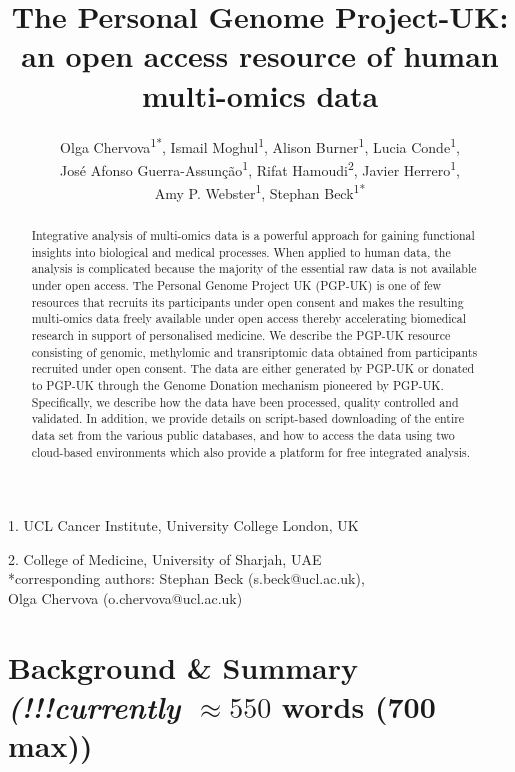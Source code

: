 \documentclass[english]{article}
\begin{document}
\title{The Personal Genome Project-UK: an open access resource of human multi-omics data}
\author{Olga Chervova\textsuperscript{1{*}}, Ismail Moghul\textsuperscript{1}, Alison Burner\textsuperscript{1}, Lucia Conde\textsuperscript{1},\\
José Afonso Guerra-Assunção\textsuperscript{1}, Rifat Hamoudi\textsuperscript{2}, Javier Herrero\textsuperscript{1},\\Amy P. Webster\textsuperscript{1}, Stephan Beck\textsuperscript{1{*}}}
\maketitle
\thispagestyle{fancy}
1. UCL Cancer Institute, University College London, UK

2. College of Medicine, University of Sharjah, UAE\\
{*}corresponding authors: Stephan Beck (s.beck@ucl.ac.uk),\\Olga Chervova (o.chervova@ucl.ac.uk)
\begin{abstract}
Integrative analysis of multi-omics data is a powerful approach for gaining functional insights into biological and medical processes. When applied to human data, the analysis is complicated because the majority of the essential raw data is not available under open access. The Personal Genome Project UK (PGP-UK) is one of few resources that recruits its participants under open consent and makes the resulting multi-omics data freely available under open access thereby accelerating biomedical research in support of personalised medicine. We describe the PGP-UK resource consisting of genomic, methylomic and transriptomic data obtained from participants recruited under open consent. The data are either generated by PGP-UK or donated to PGP-UK through the Genome Donation mechanism pioneered by PGP-UK. Specifically, we describe how the data have been processed, quality controlled and validated. In addition, we provide details on script-based downloading of the entire data set from the various public databases, and how to access the data using two cloud-based environments which also provide a platform for free integrated analysis.
\end{abstract}

\section*{Background \& Summary \small\textit{(!!!currently $\approx550$} words (700 max))}
\end{document}
